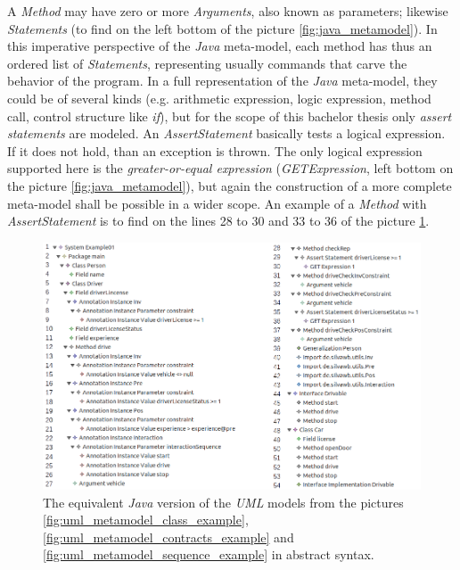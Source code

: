 \documentclass[tuberlin,cic,tc,english,noabntcite]{iiufrgs}
\begin{document}
A \emph{Method} may have zero or more \emph{Arguments}, also known as parameters; likewise \emph{Statements} (to find on the left bottom of the picture \ref{fig:java_metamodel}). In this imperative perspective of the \emph{Java} meta-model, each method has thus an ordered list of \emph{Statements}, representing usually commands that carve the behavior of the program. In a full representation of the \emph{Java} meta-model, they could be of several kinds (e.g. arithmetic expression, logic expression, method call, control structure like \emph{if}), but for the scope of this bachelor thesis only \emph{assert statements} are modeled. An \emph{AssertStatement} basically tests a logical expression. If it does not hold, than an exception is thrown. The only logical expression supported here is the \emph{greater-or-equal expression} (\emph{GETExpression}, left bottom on the picture \ref{fig:java_metamodel}), but again the construction of a more complete meta-model shall be possible in a wider scope. An example of a \emph{Method} with \emph{AssertStatement} is to find on the lines 28 to 30 and 33 to 36 of the picture \ref{fig:java_metamodel_example}.

\begin{figure}[h]
    \caption{The equivalent \emph{Java} version of the \emph{UML} models from the pictures \ref{fig:uml_metamodel_class_example},  \ref{fig:uml_metamodel_contracts_example} and \ref{fig:uml_metamodel_sequence_example} in abstract syntax.}
    \begin{center}
        \includegraphics[width=38em]{javaMetamodelExample01}
    \end{center}
    \label{fig:java_metamodel_example}
\end{figure}
\end{document}
